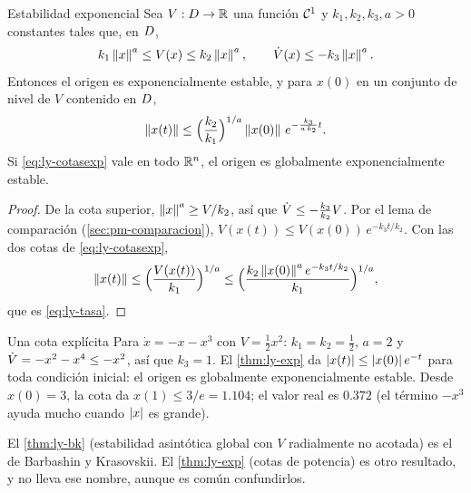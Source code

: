 \begin{teorema}[label=thm:ly-exp]{Estabilidad exponencial \citep[Teo.~4.10]{Kha02}}
Sea $V:D\to\mathbb{R}$ una función $\mathcal{C}^{1}$ y $k_1,k_2,k_3,a>0$ constantes tales que, en $D$,
\begin{equation}
  k_1\left\lVert x\right\rVert^a\le V(x)\le k_2\left\lVert x\right\rVert^a,\qquad \dot V(x)\le-k_3\left\lVert x\right\rVert^a .
  \label{eq:ly-cotasexp}
\end{equation}
Entonces el origen es exponencialmente estable, y para $x(0)$ en un conjunto de nivel de $V$ contenido en $D$,
\begin{equation}
  \left\lVert x(t)\right\rVert\le\Bigl(\frac{k_2}{k_1}\Bigr)^{1/a}\left\lVert x(0)\right\rVert\,e^{-\frac{k_3}{a\,k_2}t} .
  \label{eq:ly-tasa}
\end{equation}
Si \eqref{eq:ly-cotasexp} vale en todo $\mathbb{R}^n$, el origen es globalmente exponencialmente estable.
\end{teorema}

\begin{proof}
De la cota superior, $\left\lVert x\right\rVert^a\ge V/k_2$, así que $\dot V\le-\frac{k_3}{k_2}V$. Por el lema de comparación (\cref{sec:pm-comparacion}), $V(x(t))\le V(x(0))\,e^{-k_3t/k_2}$. Con las dos cotas de \eqref{eq:ly-cotasexp},
\[
  \left\lVert x(t)\right\rVert\le\Bigl(\frac{V(x(t))}{k_1}\Bigr)^{1/a}\le\Bigl(\frac{k_2\left\lVert x(0)\right\rVert^ae^{-k_3t/k_2}}{k_1}\Bigr)^{1/a},
\]
que es \eqref{eq:ly-tasa}.
\end{proof}

\begin{ejemplo}[label=ej:ly-gesx3]{Una cota explícita}
Para $\dot x=-x-x^3$ con $V=\tfrac12x^2$: $k_1=k_2=\tfrac12$, $a=2$ y $\dot V=-x^2-x^4\le-x^2$, así que $k_3=1$. El \cref{thm:ly-exp} da $\left\lvert x(t)\right\rvert\le\left\lvert x(0)\right\rvert e^{-t}$ para toda condición inicial: el origen es globalmente exponencialmente estable. Desde $x(0)=3$, la cota da $x(1)\le3/e=1.104$; el valor real es $0.372$ (el término $-x^3$ ayuda mucho cuando $\left\lvert x\right\rvert$ es grande).
\end{ejemplo}


\begin{cuidado}[Nombres]
El \cref{thm:ly-bk} (estabilidad asintótica global con $V$ radialmente no acotada) es el de Barbashin y Krasovskii. El \cref{thm:ly-exp} (cotas de potencia) es otro resultado, y no lleva ese nombre, aunque es común confundirlos.
\end{cuidado}
